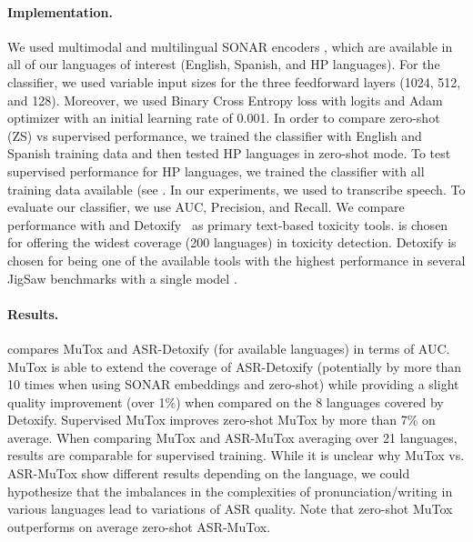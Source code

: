 \paragraph{Implementation.} We used multimodal and multilingual SONAR encoders \citep{Duquenne:2023:sonar_arxiv}, which are available in all of our languages of interest (English, Spanish, and HP languages). For the classifier, we used variable input sizes for the three feedforward layers (1024, 512, and 128). Moreover, we used Binary Cross Entropy loss with logits and Adam optimizer with an initial learning rate of 0.001. In order to compare zero-shot (ZS) vs supervised performance, we trained the classifier with English and Spanish training data and then tested HP languages in zero-shot mode. To test supervised performance for HP languages, we trained the classifier with all training data available (see . In our experiments, we used \whisperlarge to transcribe speech. %
To evaluate our classifier, we use AUC, Precision, and Recall. We compare performance with \etox \citep{costajussa2023toxicity} and Detoxify~\citep{Detoxify} as primary text-based toxicity tools. \etox is chosen for offering the widest coverage (200 languages) in toxicity detection. Detoxify is chosen for being one of the available tools with the highest performance in several JigSaw benchmarks with a single model \citep{detoxify-justification}.

\paragraph{Results.}  compares MuTox and ASR-Detoxify (for available languages) in terms of AUC. MuTox is able to extend the coverage of ASR-Detoxify (potentially by more than 10 times when using SONAR embeddings and zero-shot) while providing a slight quality improvement (over 1\%) when compared on the 8 languages covered by Detoxify. Supervised MuTox improves zero-shot MuTox by more than 7\% on average. When comparing MuTox and ASR-MuTox averaging over 21 languages, results are comparable for supervised training. While it is unclear why MuTox vs. ASR-MuTox show different results depending on the language, we could hypothesize that the imbalances in the complexities of pronunciation/writing in various languages lead to variations of ASR quality. %
Note that zero-shot MuTox outperforms on average zero-shot ASR-MuTox. 



